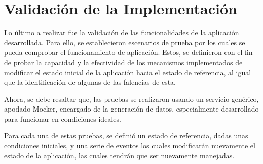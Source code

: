 \section{Validación de la Implementación} \label{sec:experimental}

Lo último a realizar fue la validación de las funcionalidades de la aplicación desarrollada. Para ello, se establecieron escenarios de prueba por los cuales se pueda comprobar el funcionamiento de aplicación. Estos, se definieron con el fin de probar la capacidad y la efectividad de los mecanismos implementados de modificar el estado inicial de la aplicación hacia el estado de referencia, al igual que la identificación de algunas de las falencias de esta.

Ahora, se debe resaltar que, las pruebas se realizaron usando un servicio genérico, apodado Mocker, encargado de la generación de datos, especialmente desarrollado para funcionar en condiciones ideales. 

Para cada una de estas pruebas, se definió un estado de referencia, dadas unas condiciones iniciales, y una serie de eventos los cuales modificarán nuevamente el estado de la aplicación, las cuales tendrán que ser nuevamente manejadas.



